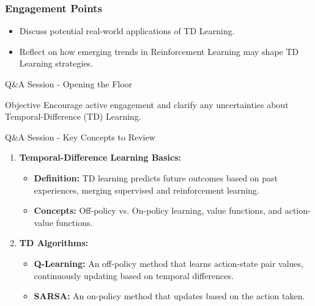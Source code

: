 \documentclass[aspectratio=169]{beamer}
\begin{document}
\begin{frame}[fragile]
    \frametitle{Engagement Points}
    \begin{itemize}
        \item Discuss potential real-world applications of TD Learning.
        \item Reflect on how emerging trends in Reinforcement Learning may shape TD Learning strategies.
    \end{itemize}
\end{frame}

\begin{frame}[fragile]{Q\&A Session - Opening the Floor}
    \begin{block}{Objective}
        Encourage active engagement and clarify any uncertainties about Temporal-Difference (TD) Learning.
    \end{block}
\end{frame}

\begin{frame}[fragile]{Q\&A Session - Key Concepts to Review}
    \begin{enumerate}
        \item \textbf{Temporal-Difference Learning Basics:}
        \begin{itemize}
            \item \textbf{Definition:} TD learning predicts future outcomes based on past experiences, merging supervised and reinforcement learning.
            \item \textbf{Concepts:} Off-policy vs. On-policy learning, value functions, and action-value functions.
        \end{itemize}

        \item \textbf{TD Algorithms:}
        \begin{itemize}
            \item \textbf{Q-Learning:} An off-policy method that learns action-state pair values, continuously updating based on temporal differences.
            \item \textbf{SARSA:} An on-policy method that updates based on the action taken.
        \end{itemize}
    \end{enumerate}
\end{frame}
\end{document}
